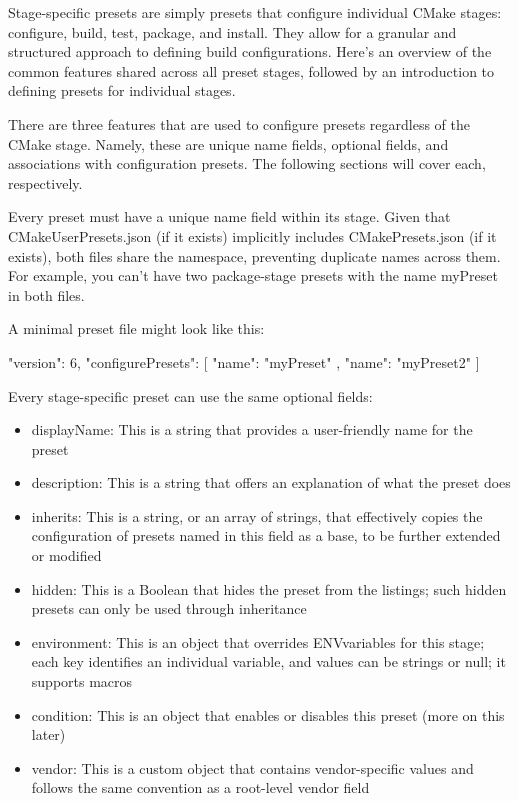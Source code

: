 

Stage-specific presets are simply presets that configure individual CMake stages: configure, build, test, package, and install. They allow for a granular and structured approach to defining build configurations. Here’s an overview of the common features shared across all preset stages, followed by an introduction to defining presets for individual stages.


There are three features that are used to configure presets regardless of the CMake stage. Namely, these are unique name fields, optional fields, and associations with configuration presets. The following sections will cover each, respectively.



Every preset must have a unique name field within its stage. Given that CMakeUserPresets.json (if it exists) implicitly includes CMakePresets.json (if it exists), both files share the namespace, preventing duplicate names across them. For example, you can’t have two package-stage presets with the name myPreset in both files.

A minimal preset file might look like this:

\begin{json}
{
    "version": 6,
    "configurePresets": [
    {
        "name": "myPreset"
    },
    {
        "name": "myPreset2"
    }
    ]
}
\end{json}



Every stage-specific preset can use the same optional fields:

\begin{itemize}
\item
displayName: This is a string that provides a user-friendly name for the preset

\item
description: This is a string that offers an explanation of what the preset does

\item
inherits: This is a string, or an array of strings, that effectively copies the configuration of presets named in this field as a base, to be further extended or modified

\item
hidden: This is a Boolean that hides the preset from the listings; such hidden presets can only be used through inheritance

\item
environment: This is an object that overrides ENVvariables for this stage; each key identifies an individual variable, and values can be strings or null; it supports macros

\item
condition: This is an object that enables or disables this preset (more on this later)

\item
vendor: This is a custom object that contains vendor-specific values and follows the same convention as a root-level vendor field
\end{itemize}

